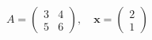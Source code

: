 \documentclass[preview]{standalone}
\begin{document}
\begin{align*}
A = \begin{pmatrix} 3 & 4 \\ 5 & 6 \end{pmatrix}, \quad \mathbf{x} = \begin{pmatrix} 2 \\ 1 \end{pmatrix}
\end{align*}
\end{document}
